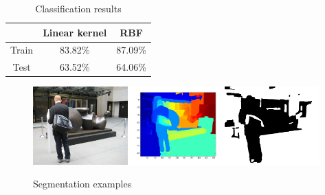 \documentclass{article}
\begin{document}
\begin{table}
\begin{centering}
\caption{Classification results}
\begin{tabular}{|c|c|c|}
\hline 
 & Linear kernel & RBF\tabularnewline
\hline 
\hline 
Train & 83.82\% & 87.09\%\tabularnewline
\hline 
Test & 63.52\% & 64.06\%\tabularnewline
\hline 
\end{tabular}
\par\end{centering}

\end{table}


\begin{figure}


\caption{Segmentation examples}


\begin{centering}
\includegraphics[height=3cm]{images/Henry_Moore_Goslar_Warrior_0072}\includegraphics[height=3cm]{images/Henry_Moore_Goslar_Warrior_0072_gpb}\includegraphics[height=3cm]{images/Henry_Moore_Goslar_Warrior_0072_MASK}
\par\end{centering}


\end{figure}
\end{document}
